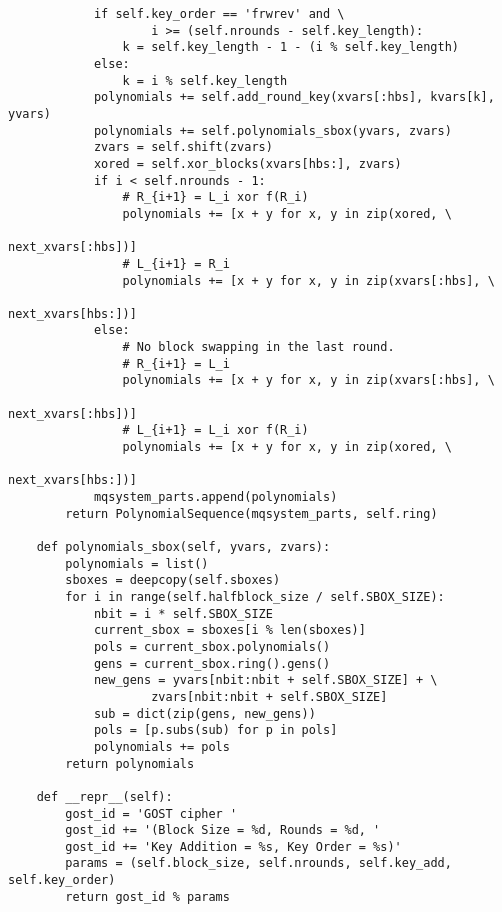 \begin{lstlisting}
            if self.key_order == 'frwrev' and \
                    i >= (self.nrounds - self.key_length):
                k = self.key_length - 1 - (i % self.key_length)
            else:
                k = i % self.key_length
            polynomials += self.add_round_key(xvars[:hbs], kvars[k], yvars)
            polynomials += self.polynomials_sbox(yvars, zvars)
            zvars = self.shift(zvars)
            xored = self.xor_blocks(xvars[hbs:], zvars)
            if i < self.nrounds - 1:
                # R_{i+1} = L_i xor f(R_i)
                polynomials += [x + y for x, y in zip(xored, \
                                                        next_xvars[:hbs])]
                # L_{i+1} = R_i
                polynomials += [x + y for x, y in zip(xvars[:hbs], \
                                                        next_xvars[hbs:])]
            else:
                # No block swapping in the last round.
                # R_{i+1} = L_i
                polynomials += [x + y for x, y in zip(xvars[:hbs], \
                                                        next_xvars[:hbs])]
                # L_{i+1} = L_i xor f(R_i)
                polynomials += [x + y for x, y in zip(xored, \
                                                        next_xvars[hbs:])]
            mqsystem_parts.append(polynomials)
        return PolynomialSequence(mqsystem_parts, self.ring)

    def polynomials_sbox(self, yvars, zvars):
        polynomials = list()
        sboxes = deepcopy(self.sboxes)
        for i in range(self.halfblock_size / self.SBOX_SIZE):
            nbit = i * self.SBOX_SIZE
            current_sbox = sboxes[i % len(sboxes)]
            pols = current_sbox.polynomials()
            gens = current_sbox.ring().gens()
            new_gens = yvars[nbit:nbit + self.SBOX_SIZE] + \
                    zvars[nbit:nbit + self.SBOX_SIZE] 
            sub = dict(zip(gens, new_gens))
            pols = [p.subs(sub) for p in pols]
            polynomials += pols
        return polynomials

    def __repr__(self):
        gost_id = 'GOST cipher '
        gost_id += '(Block Size = %d, Rounds = %d, '
        gost_id += 'Key Addition = %s, Key Order = %s)' 
        params = (self.block_size, self.nrounds, self.key_add, self.key_order)
        return gost_id % params


\end{lstlisting}
